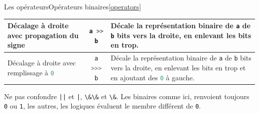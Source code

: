 \documentclass{beamer}
\begin{document}
\begin{frame}{Les opérateurs}{Opérateurs binaires\cref{operators}}
\begin{scriptsize}
\begin{table}[h!]
\begin{tabular}{|p{3cm}|c|p{6cm}|}
                    \hline
                    Décalage à droite avec propagation du signe                             & \lstinline[language=Javascript]!a >> b!  & Décale la représentation binaire de \lstinline[language=Javascript]!a! de \lstinline[language=Javascript]!b! bits vers la droite, en enlevant les bits en trop.                                                                \\
                    \hline
                    Décalage à droite avec remplissage à \lstinline[language=Javascript]!0! & \lstinline[language=Javascript]!a >>> b! & Décale la représentation binaire de \lstinline[language=Javascript]!a! de \lstinline[language=Javascript]!b! bits vers la droite, en enlevant les bits en trop et en ajoutant des \lstinline[language=Javascript]!0! à gauche. \\
                    \hline
                \end{tabular}
            \end{table}
            \begin{dangercolorbox}
                Ne pas confondre \lstinline{||} et \lstinline{|}, \lstinline{\&\&} et \lstinline{\&}.
                Les binaires comme ici, renvoient toujours \lstinline{0} ou \lstinline{1}, les autres, les logiques évaluent le membre différent de \lstinline{0}.
            \end{dangercolorbox}
        \end{scriptsize}
    \end{frame}
\end{document}
